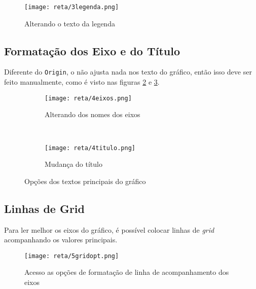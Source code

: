     \begin{figure}[htbp]
        \centering
        \texttt{[image: reta/3legenda.png]}

        \caption{Alterando o texto da legenda}
        \label{fig:reta:legenda}
    \end{figure}


\subsection{Formatação dos Eixo e do Título}

    Diferente do \texttt{Origin}, o \software não ajusta nada nos texto do gráfico, então isso deve ser feito manualmente, como é visto nas figuras \ref{fig:reta:eixo} e \ref{fig:reta:titulo}.

    \begin{figure}[htbp]
        \centering
        \begin{subfigure}{0.45\textwidth}
            \centering
            \texttt{[image: reta/4eixos.png]}

            \caption{Alterando dos nomes dos eixos}
            \label{fig:reta:eixo}
        \end{subfigure}
        ~
        \begin{subfigure}{0.45\textwidth}
            \centering
            \texttt{[image: reta/4titulo.png]}

            \caption{Mudança do título}
            \label{fig:reta:titulo}
        \end{subfigure}
        \caption{Opções dos textos principais do gráfico}
        \label{fig:reta:textos}
    \end{figure}


\subsection{Linhas de Grid}

    Para ler melhor os eixos do gráfico, é possível colocar linhas de \textit{grid} acompanhando os valores principais.

    \begin{figure}[htbp]
        \centering
        \texttt{[image: reta/5gridopt.png]}

        \caption{Acesso as opções de formatação de linha de acompanhamento dos eixos}
        \label{fig:reta:gridopt}
    \end{figure}

